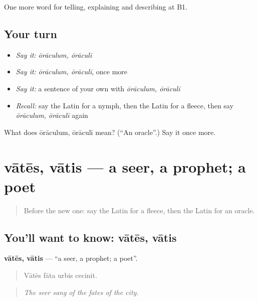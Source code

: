 \begin{grammarlens}[title={What you've built}]
One more word for telling, explaining and describing at B1.
\end{grammarlens}

\subsection*{Your turn}
\begin{itemize}
\raggedright
  \item \emph{Say it:} \emph{ōrāculum, ōrāculī}
  \item \emph{Say it:} \emph{ōrāculum, ōrāculī}, once more
  \item \emph{Say it:} a sentence of your own with \emph{ōrāculum, ōrāculī}
  \item \emph{Recall:} say the Latin for a nymph, then the Latin for a fleece, then say \emph{ōrāculum, ōrāculī} again
\end{itemize}

\begin{tcolorbox}[breakable,colback=teal!4,colframe=teal!35!black,title={Before you move on}]
What does ōrāculum, ōrāculī mean? (\textquotedblleft{}An oracle\textquotedblright{}.) Say it once more.
\end{tcolorbox}
\section[vātēs, vātis]{vātēs, vātis — a seer, a prophet; a poet}

\label{lesson:LA-C348-vates}



\begin{quote}
Before the new one: say the Latin for a fleece, then the Latin for an oracle.
\end{quote}

\subsection*{You'll want to know: vātēs, vātis}
\textbf{vātēs, vātis} — \textquotedblleft{}a seer, a prophet; a poet\textquotedblright{}.

\begin{quote}
Vātēs fāta urbis cecinit.
\end{quote}

\begin{quote}
\emph{The seer sang of the fates of the city.}
\end{quote}

